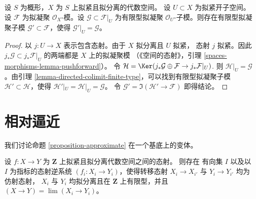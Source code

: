\begin{lemma}
\label{lemma-extend}
设 $S$ 为概形，$X$ 为 $S$ 上拟紧且拟分离的代数空间。
设 $U \subset X$ 为拟紧开子空间。设 $\mathcal{F}$ 为拟凝聚
$\mathcal{O}_X$-模。设
$\mathcal{G} \subset \mathcal{F}|_U$ 为有限型拟凝聚
$\mathcal{O}_U$-子模。则存在有限型拟凝聚子模
$\mathcal{G}' \subset \mathcal{F}$，使得
$\mathcal{G}'|_U = \mathcal{G}$。
\end{lemma}

\begin{proof}
以 $j : U \to X$ 表示包含态射。由于 $X$ 拟分离且 $U$ 拟紧，
态射 $j$ 拟紧。因此
$j_*\mathcal{G} \subset j_*\mathcal{F}|_U$ 的两端都是 $X$ 上的拟凝聚模
（《空间的态射》，引理
\ref{spaces-morphisms-lemma-pushforward}）。
令 $\mathcal{H} =
\Ker(j_*\mathcal{G} \oplus \mathcal{F} \to j_*\mathcal{F}|_U)$.
则 $\mathcal{H}|_U = \mathcal{G}$。由引理
\ref{lemma-directed-colimit-finite-type}，可以找到有限型拟凝聚子模
$\mathcal{H}' \subset \mathcal{H}$，使得
$\mathcal{H}'|_U = \mathcal{H}|_U = \mathcal{G}$。
令 $\mathcal{G}' = \Im(\mathcal{H}' \to \mathcal{F})$ 即得结论。
\end{proof}









\section{相对逼近}
\label{section-relative-approximation}

\noindent
我们讨论命题 \ref{proposition-approximate} 在一个基底上的变体。

\begin{lemma}
\label{lemma-approximate-morphism}
设 $f : X \to Y$ 为 $\mathbf{Z}$ 上拟紧且拟分离代数空间之间的态射。
则存在
有向集 $I$ 以及以 $I$ 为指标的态射逆系统
$(f_i : X_i \to Y_i)$，使得转移态射
$X_i \to X_{i'}$ 与 $Y_i \to Y_{i'}$ 均为仿射态射，
$X_i$ 与 $Y_i$ 均拟分离且在 $\mathbf{Z}$ 上有限型，并且
$(X \to Y) = \lim (X_i \to Y_i)$。
\end{lemma}

